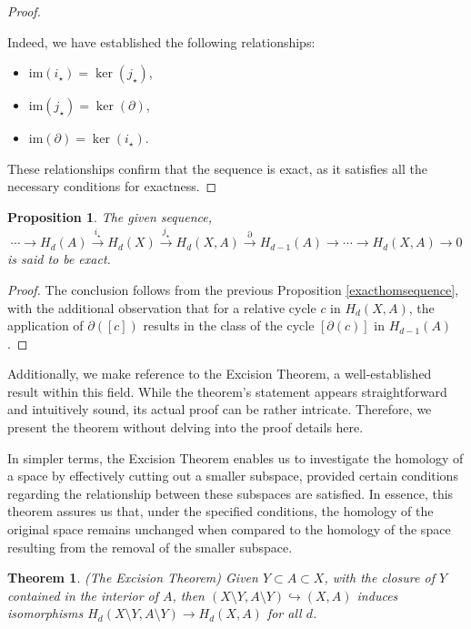 \documentclass{amsart}
\newtheorem{theorem}[section]{Theorem}
\newtheorem{proposition}[definition]{Proposition}
\begin{document}
\begin{proof}
\begin{enumerate}
\end{enumerate}
Indeed, we have established the following relationships:
\begin{itemize}
    \item $\text{im}(i_\star) = \ker(j_\star)$,
    \item $\text{im}(j_\star) = \ker(\partial)$,
    \item $\text{im}(\partial) = \ker(i_\star)$.
\end{itemize}
These relationships confirm that the sequence is exact, as it satisfies all the necessary conditions for exactness.\end{proof}

\begin{proposition}
The given sequence,
\begin{equation*}
\cdots \rightarrow H_d(A) \xrightarrow{i_\star} H_d(X) \xrightarrow{j_\star} H_d(X,A) \xrightarrow{\partial} H_{d-1}(A) \rightarrow \cdots \rightarrow H_d(X,A) \rightarrow 0
\end{equation*}
is said to be exact.
\end{proposition}

\begin{proof}
The conclusion follows from the previous Proposition \ref{exacthomsequence}, with the additional observation that for a relative cycle $c$ in $H_d(X,A)$, the application of $\partial([c])$ results in the class of the cycle $[\partial(c)]$ in $H_{d-1}(A)$.
\end{proof}

Additionally, we make reference to the Excision Theorem, a well-established result within this field. While the theorem's statement appears straightforward and intuitively sound, its actual proof can be rather intricate. Therefore, we present the theorem without delving into the proof details here.

In simpler terms, the Excision Theorem enables us to investigate the homology of a space by effectively \glqq cutting out\grqq{} a smaller subspace, provided certain conditions regarding the relationship between these subspaces are satisfied. In essence, this theorem assures us that, under the specified conditions, the homology of the original space remains unchanged when compared to the homology of the space resulting from the removal of the smaller subspace.

\begin{theorem}{(The Excision Theorem)}
\label{excisiontheorem}
Given $Y \subset A \subset X$, with the closure of $Y$ contained in the interior of $A$, then $(X\setminus Y, A \setminus Y) \hookrightarrow (X,A)$ induces isomorphisms $H_d(X\setminus Y, A\setminus Y) \rightarrow H_d(X,A)$ for all $d$.
\end{theorem}
\end{document}
